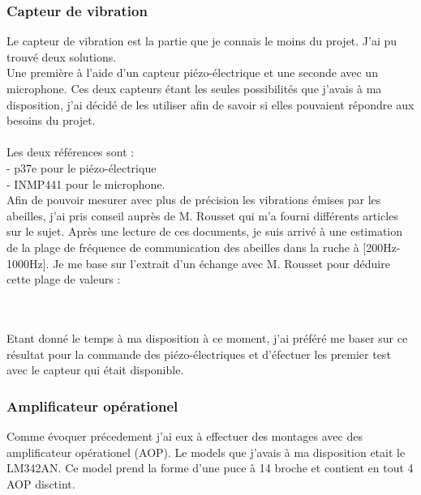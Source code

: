 \documentclass[12pt,french,a4paper]{article}
\begin{document}
\subsubsection{Capteur de vibration}
Le capteur de vibration est la partie que je connais le moins du projet. J'ai pu trouvé deux solutions.\\
 Une première à l'aide d'un capteur piézo-électrique et une seconde avec un  microphone. Ces deux capteurs étant les seules possibilités que j'avais à ma disposition, 
 j'ai décidé de les utiliser afin de savoir si elles pouvaient répondre aux besoins du projet.\\
\\
 Les deux références sont :\\
- p37e pour le piézo-électrique\\
- INMP441 pour le microphone.\\

Afin de pouvoir mesurer avec plus de précision les vibrations émises par les abeilles, j'ai pris conseil auprès de M. Rousset qui m'a fourni différents articles sur le sujet.
Après une lecture de ces documents, je suis arrivé à une estimation de la plage de fréquence de communication des abeilles dans la ruche à [200Hz-1000Hz]. Je me base sur l'extrait d'un échange avec M. Rousset pour déduire cette plage de valeurs : \\ 
\\
\\


Etant donné le temps à ma disposition à ce moment, j'ai préféré me baser sur ce résultat pour la commande des piézo-électriques et d'éfectuer les premier test avec le capteur qui était disponible. 

\subsubsection{Amplificateur opérationel} 
Comme évoquer précedement j'ai eux à effectuer des montages avec des amplificateur opérationel (AOP). Le models que j'avais à ma disposition etait le LM342AN. Ce model prend la forme d'une puce à 14 broche et contient en tout 4 AOP disctint. 
\end{document}

